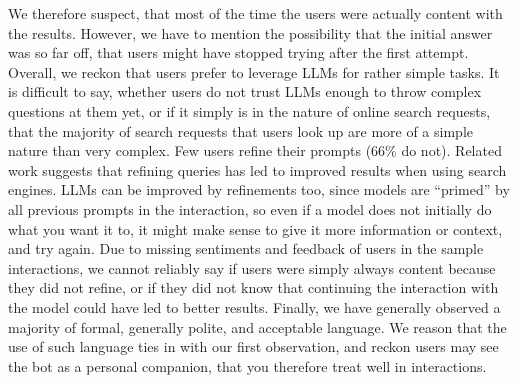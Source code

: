 We therefore suspect, that most of the time the users were actually content with the results.
However, we have to mention the possibility that the initial answer was so far off,
that users might have stopped trying after the first attempt.
Overall, we reckon that users prefer to leverage LLMs for rather simple tasks.
It is difficult to say, whether users do not trust LLMs enough to throw complex questions at
them yet, or if it simply is in the nature of online search requests, that the majority of search
requests that users look up are more of a simple nature than very complex.
Few users refine their prompts (66\% do not).
Related work suggests that refining queries has led to improved results when using search
engines.
LLMs can be improved by refinements too, since models are “primed” by all previous prompts in
the interaction, so even if a model does not initially do what you want it to, it might make
sense to give it more information or context, and try again.
Due to missing sentiments and feedback of users in the sample interactions, we cannot reliably say
if users were simply always content because they did not refine, or if they did not know that
continuing the interaction with the model could have led to better results.
Finally, we have generally observed a majority of formal, generally polite, and acceptable language.
We reason that the use of such language ties in with our first observation, and reckon users may see
the bot as a personal companion, that you therefore treat well in interactions.

